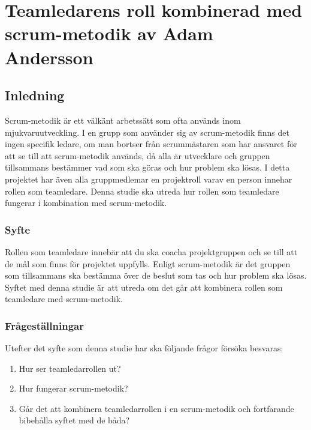 \chapter{Teamledarens roll kombinerad med scrum-metodik av Adam Andersson}

\section{Inledning}
Scrum-metodik är ett välkänt arbetssätt som ofta används inom mjukvaruutveckling. I en grupp som använder sig av scrum-metodik finns det ingen specifik ledare, om man bortser från scrummästaren som har ansvaret för att se till att scrum-metodik används, då alla är utvecklare och gruppen tillsammans bestämmer vad som ska göras och hur problem ska lösas.
I detta projektet har även alla gruppmedlemar en projektroll varav en person innehar rollen som teamledare. Denna studie ska utreda hur rollen som teamledare fungerar i kombination med scrum-metodik.

\subsection{Syfte}
Rollen som teamledare innebär att du ska coacha projektgruppen och se till att de mål som finns för projektet uppfylls. Enligt scrum-metodik är det gruppen som tillsammans ska bestämma över de beslut som tas och hur problem ska lösas. Syftet med denna studie är att utreda om det går att kombinera rollen som teamledare med scrum-metodik.

\subsection{Frågeställningar}
Utefter det syfte som denna studie har ska följande frågor försöka besvaras:

\begin{enumerate}
	\item Hur ser teamledarrollen ut?
	\item Hur fungerar scrum-metodik?
	\item Går det att kombinera teamledarrollen i en scrum-metodik och fortfarande bibehålla syftet med de båda? 
\end{enumerate}

